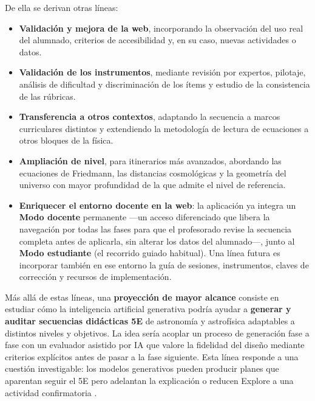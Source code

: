 De ella se derivan otras líneas:

\begin{itemize}
\item \textbf{Validación y mejora de la web}, incorporando la observación del uso real del alumnado, criterios de accesibilidad y, en su caso, nuevas actividades o datos.

\item \textbf{Validación de los instrumentos}, mediante revisión por expertos, pilotaje, análisis de dificultad y discriminación de los ítems y estudio de la consistencia de las rúbricas.

\item \textbf{Transferencia a otros contextos}, adaptando la secuencia a marcos curriculares distintos y extendiendo la metodología de lectura de ecuaciones a otros bloques de la física.

\item \textbf{Ampliación de nivel}, para itinerarios más avanzados, abordando las ecuaciones de Friedmann, las distancias cosmológicas y la geometría del universo con mayor profundidad de la que admite el nivel de referencia.

\item \textbf{Enriquecer el entorno docente en la web}: la aplicación ya integra un \textbf{Modo docente} permanente ---un acceso diferenciado que libera la navegación por todas las fases para que el profesorado revise la secuencia completa antes de aplicarla, sin alterar los datos del alumnado---, junto al \textbf{Modo estudiante} (el recorrido guiado habitual). Una línea futura es incorporar también en ese entorno la guía de sesiones, instrumentos, claves de corrección y recursos de implementación.
\end{itemize}

Más allá de estas líneas, una \textbf{proyección de mayor alcance} consiste en estudiar cómo la inteligencia artificial generativa podría ayudar a \textbf{generar y auditar secuencias didácticas 5E} de astronomía y astrofísica adaptables a distintos niveles y objetivos. La idea sería acoplar un proceso de generación fase a fase con un evaluador asistido por IA que valore la fidelidad del diseño mediante criterios explícitos antes de pasar a la fase siguiente. Esta línea responde a una cuestión investigable: los modelos generativos pueden producir planes que aparentan seguir el 5E pero adelantan la explicación o reducen Explore a una actividad confirmatoria \parencite{goodman2024,peikos2025}.

